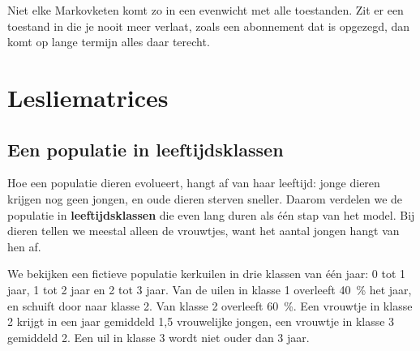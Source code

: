 Niet elke Markovketen komt zo in een evenwicht met alle toestanden. Zit er een toestand in die je nooit meer verlaat, zoals een abonnement dat is opgezegd, dan komt op lange termijn alles daar terecht.

\begin{oefeningen}

\end{oefeningen}

\section{Lesliematrices}

\subsection{Een populatie in leeftijdsklassen}

Hoe een populatie dieren evolueert, hangt af van haar leeftijd: jonge dieren krijgen nog geen jongen, en oude dieren sterven sneller. Daarom verdelen we de populatie in \textbf{leeftijdsklassen} die even lang duren als één stap van het model. Bij dieren tellen we meestal alleen de vrouwtjes, want het aantal jongen hangt van hen af.

We bekijken een fictieve populatie kerkuilen in drie klassen van één jaar: 0 tot 1 jaar, 1 tot 2 jaar en 2 tot 3 jaar. Van de uilen in klasse 1 overleeft 40~\% het jaar, en schuift door naar klasse 2. Van klasse 2 overleeft 60~\%. Een vrouwtje in klasse 2 krijgt in een jaar gemiddeld 1,5 vrouwelijke jongen, een vrouwtje in klasse 3 gemiddeld 2. Een uil in klasse 3 wordt niet ouder dan 3 jaar.


